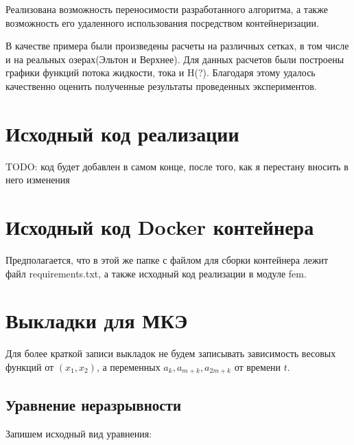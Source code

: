 \documentclass[14pt]{extreport}
\begin{document}
Реализована возможность переносимости разработанного алгоритма, а также возможность его удаленного использования посредством контейнеризации.

В качестве примера были произведены расчеты на различных сетках, в том числе и на реальных озерах(Эльтон и Верхнее). Для данных расчетов были построены графики функций потока жидкости, тока и H(?). Благодаря этому удалось качественно оценить полученные результаты проведенных экспериментов.




\Appendix

\chapter{Исходный код реализации}
TODO: код будет добавлен в самом конце, после того, как я перестану вносить в него изменения

\chapter{Исходный код Docker контейнера}

Предполагается, что в этой же папке с файлом для сборки контейнера лежит файл requirements.txt, а также исходный код реализации в модуле fem.

\begin{minipage}{\linewidth}

\end{minipage}

\begin{minipage}{\linewidth}

\end{minipage}
 
\chapter{Выкладки для МКЭ}

 Для более краткой записи выкладок не будем записывать зависимость весовых функций от $(x_1, x_2)$, а переменных $a_k, a_{m+k}, a_{2m+k}$ от времени $t$.

\section{Уравнение неразрывности}

Запишем исходный вид уравнения:
\end{document}
